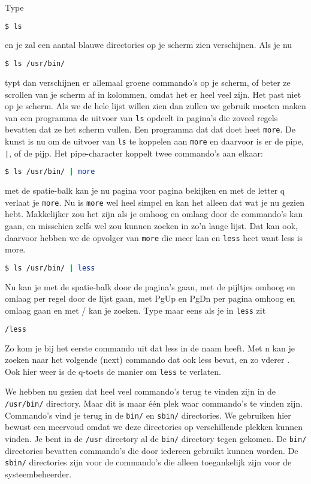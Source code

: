 Type
\begin{lstlisting}[language=bash]
$ ls
\end{lstlisting}
en je zal een aantal blauwe directories op je scherm zien verschijnen. Als je nu
\begin{lstlisting}[language=bash]
$ ls /usr/bin/
\end{lstlisting}
typt dan verschijnen er allemaal groene commando's op je scherm, of beter ze scrollen van je scherm af in kolommen, omdat het er heel veel zijn. Het past niet op je scherm. Als we de hele lijst willen zien dan zullen we gebruik moeten maken van een programma de uitvoer van \texttt{ls} opdeelt in pagina's die zoveel regels bevatten dat ze het scherm vullen.
Een programma dat dat doet heet \texttt{more}. De kunst is nu om de uitvoer van \texttt{ls} te koppelen aan \texttt{more} en daarvoor is er de pipe, \texttt{|}, of de pijp. Het pipe-character koppelt twee commando's aan elkaar:
\begin{lstlisting}[language=bash]
$ ls /usr/bin/ | more
\end{lstlisting}
met de spatie-balk kan je nu pagina voor pagina bekijken en met de letter q verlaat je \texttt{more}. Nu is \texttt{more} wel heel simpel en kan het alleen dat wat je nu gezien hebt. Makkelijker zou het zijn als je omhoog en omlaag door de commando's kan gaan, en misschien zelfs wel zou kunnen zoeken in zo'n lange lijst. Dat kan ook, daarvoor hebben we de opvolger van \texttt{more} die meer kan en \texttt{less} heet want less is more.

\begin{lstlisting}[language=bash]
$ ls /usr/bin/ | less
\end{lstlisting}
Nu kan je met de spatie-balk door de pagina's gaan, met de pijltjes omhoog en omlaag per regel door de lijst gaan, met PgUp en PgDn per pagina omhoog en omlaag gaan en met / kan je zoeken. Type maar eens als je in \texttt{less} zit
\begin{lstlisting}[language=bash]
/less
\end{lstlisting}
Zo kom je bij het eerste commando uit dat less in de naam heeft. Met n kan je zoeken naar het volgende (next) commando dat ook less bevat, en zo vderer . Ook hier weer is de q-toets de manier om \texttt{less} te verlaten.

We hebben nu gezien dat heel veel commando's terug te vinden zijn in de \texttt{/usr/bin/} directory. Maar dit is maar \'e\'en plek waar commando's te vinden zijn. Commando's vind je terug in de \texttt{bin/} en \texttt{sbin/} directories. We gebruiken hier bewust een meervoud omdat we deze directories op verschillende plekken kunnen vinden. Je bent in de \texttt{/usr} directory al de \texttt{bin/} directory tegen gekomen. De \texttt{bin/} directories bevatten commando's die door iedereen gebruikt kunnen worden. De \texttt{sbin/} directories zijn voor de commando's die alleen toegankelijk zijn voor de systeembeheerder.

